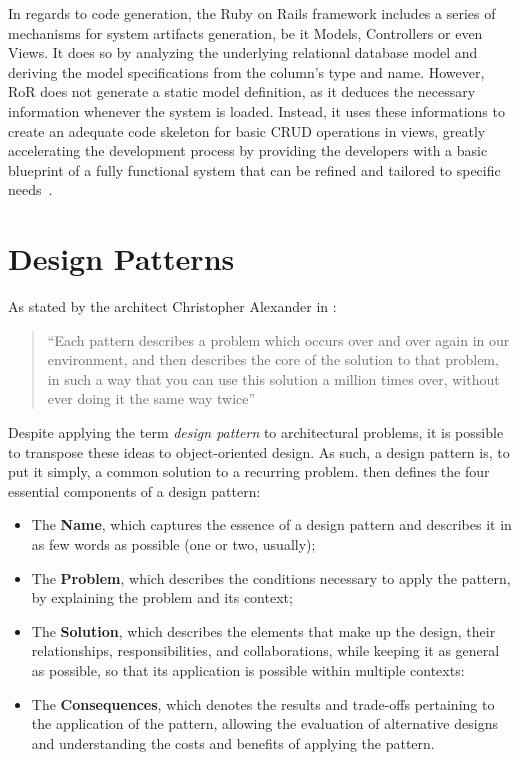 In regards to code generation, the Ruby on Rails framework includes a series of mechanisms for system artifacts generation, be it Models, Controllers or even Views. It does so by analyzing the underlying relational database model and deriving the model specifications from the column's type and name. However, RoR does not generate a static model definition, as it deduces the necessary information whenever the system is loaded. Instead, it uses these informations to create an adequate code skeleton for basic CRUD operations in views, greatly accelerating the development process by providing the developers with a basic blueprint of a fully functional system that can be refined and tailored to specific needs~\cite{rails_generators}.

\section{Design Patterns}\label{sec:design_patterns}

As stated by the architect Christopher Alexander in \cite{christopher_alexander_a_pattern_language}:

\begin{quote}
  ``Each pattern describes a problem which occurs over and over again in our environment, and then describes the core of the solution to that problem, in such a way that you can use this solution a million times over, without ever doing it the same way twice''
\end{quote}

Despite applying the term \emph{design pattern} to architectural problems, it is possible to transpose these ideas to object-oriented design. As such, a design pattern is, to put it simply, a common solution to a recurring problem. \cite{gang_of_four} then defines the four essential components of a design pattern:

\begin{itemize}
  \item The \textbf{Name}, which captures the essence of a design pattern and describes it in as few words as possible (one or two, usually); \\
  \item The \textbf{Problem}, which describes the conditions necessary to apply the pattern, by explaining the problem and its context; \\
  \item The \textbf{Solution}, which describes the elements that make up the design, their relationships, responsibilities, and collaborations, while keeping it as general as possible, so that its application is possible within multiple contexts: \\
  \item The \textbf{Consequences}, which denotes the results and trade-offs pertaining to the application of the pattern, allowing the evaluation of alternative designs and understanding the costs and benefits of applying the pattern. \\
\end{itemize}

